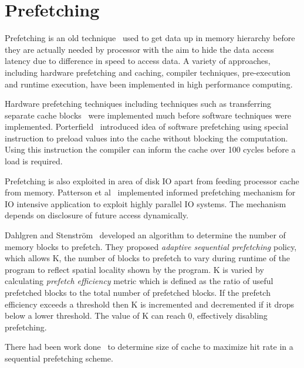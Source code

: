 \section{Prefetching}
Prefetching is an old technique~\cite{anacker68}\cite{Smith1982}\cite{Vanderwiel2000}
used to get data up in memory hierarchy before they are actually needed by processor
with the aim to hide the data access latency due to difference in speed to access
data. A variety of approaches, including hardware prefetching and caching, compiler
techniques, pre-execution and runtime execution, have been implemented in high
performance computing.

Hardware prefetching techniques including techniques such as transferring separate
cache blocks~\cite{Smith1978} were implemented much before software techniques were
implemented. Porterfield~\cite{Porterfield1989} introduced idea of software prefetching
using special instruction to preload values into the cache without blocking the
computation. Using this instruction the compiler can inform the cache over 100
cycles before a load is required.

Prefetching is also exploited in area of disk IO apart from feeding processor cache
from memory. Patterson et al~\cite{Patterson1994} implemented informed prefetching
mechanism for IO intensive application to exploit highly parallel IO systems. The
mechanism depends on disclosure of future access dynamically.

Dahlgren and Stenström~\cite{Dahlgren1993} developed an algorithm to determine the
number of memory blocks to prefetch. They proposed
\textit{adaptive sequential prefetching} policy, which allows K, the number of blocks
to prefetch to vary during runtime of the program to reflect spatial locality
shown by the program. K is varied by calculating \textit{prefetch efficiency} metric
which is defined as the ratio of useful prefetched blocks to the total number of
prefetched blocks. If the prefetch efficiency exceeds a threshold then K is
incremented and decremented if it drops below a lower threshold. The value of K
can reach 0, effectively disabling prefetching.

There had been work done~\cite{bhatia10} to determine size of cache to maximize
hit rate in a sequential prefetching scheme.
